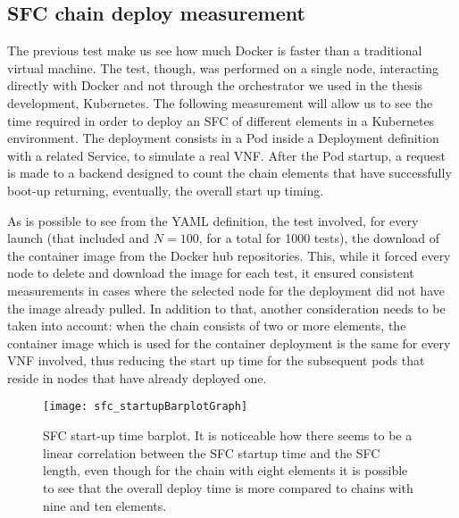 

\subsection{SFC chain deploy measurement}

The previous test make us see how much Docker is faster than a traditional
virtual machine. The test, though, was performed on a single node, interacting
directly with Docker and not through the orchestrator we used in the thesis
development, Kubernetes. The following measurement will allow us to see the time
required in order to deploy an SFC of different elements in a Kubernetes
environment. The deployment consists in a Pod inside a Deployment definition
with a related Service, to simulate a real VNF. After the Pod startup, a request
is made to a backend designed to count the chain elements that have successfully
boot-up returning, eventually, the overall start up timing.



\vspace{0.5cm}

\noindent As is possible to see from the YAML definition, the test involved, for
every launch (that included and $N = 100$, for a total for 1000 tests), the 
download of the container image from the Docker hub repositories. This, while 
it forced every node to delete and download the image for each test, it ensured 
consistent measurements in cases where the selected node for the deployment did 
not have the image already pulled. In addition to that, another consideration 
needs to be taken into account: when the chain consists of two or more 
elements, the container image which is used for the container deployment is the 
same for every VNF involved, thus reducing the start up time for the subsequent 
pods that reside in nodes that have already deployed one.

\begin{figure}[t]
  \centering
  \texttt{[image: sfc\_startupBarplotGraph]}
  \caption[SFC start-up time barplot]{SFC start-up time barplot. It is
    noticeable how there seems to be a linear correlation between the SFC
    startup time and the SFC length, even though for the chain with eight
    elements it is possible to see that the overall deploy time is more compared
    to chains with nine and ten elements.}
  \label{chap:tests:sec:sfclength:img:barplot}
\end{figure}

